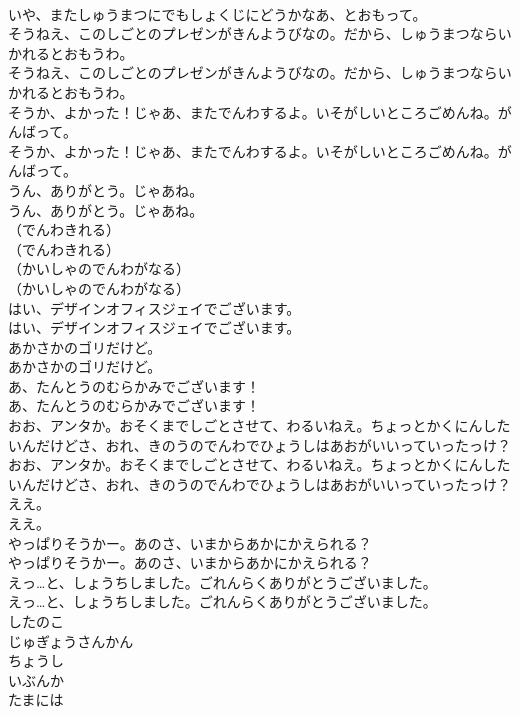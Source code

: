 \documentclass[8pt]{extreport}
\begin{document}
\begin{CJK}{UTF8}{min}
\\	いや、またしゅうまつにでもしょくじにどうかなあ、とおもって。
\\	そうねえ、このしごとのプレゼンがきんようびなの。だから、しゅうまつならいかれるとおもうわ。
\\	そうねえ、このしごとのプレゼンがきんようびなの。だから、しゅうまつならいかれるとおもうわ。
\\	そうか、よかった！じゃあ、またでんわするよ。いそがしいところごめんね。がんばって。
\\	そうか、よかった！じゃあ、またでんわするよ。いそがしいところごめんね。がんばって。
\\	うん、ありがとう。じゃあね。
\\	うん、ありがとう。じゃあね。
\\	（でんわきれる）
\\	（でんわきれる）
\\	（かいしゃのでんわがなる）
\\	（かいしゃのでんわがなる）
\\	はい、デザインオフィスジェイでございます。
\\	はい、デザインオフィスジェイでございます。
\\	あかさかのゴリだけど。
\\	あかさかのゴリだけど。
\\	あ、たんとうのむらかみでございます！
\\	あ、たんとうのむらかみでございます！
\\	おお、アンタか。おそくまでしごとさせて、わるいねえ。ちょっとかくにんしたいんだけどさ、おれ、きのうのでんわでひょうしはあおがいいっていったっけ？
\\	おお、アンタか。おそくまでしごとさせて、わるいねえ。ちょっとかくにんしたいんだけどさ、おれ、きのうのでんわでひょうしはあおがいいっていったっけ？
\\	ええ。
\\	ええ。
\\	やっぱりそうかー。あのさ、いまからあかにかえられる？
\\	やっぱりそうかー。あのさ、いまからあかにかえられる？
\\	えっ…と、しょうちしました。ごれんらくありがとうございました。
\\	えっ…と、しょうちしました。ごれんらくありがとうございました。
\\	したのこ
\\	じゅぎょうさんかん
\\	ちょうし
\\	いぶんか
\\	たまには

\end{CJK}
\end{document}
